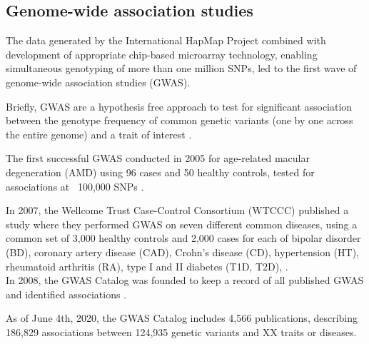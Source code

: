 
\subsection{Genome-wide association studies}

The data generated by the International HapMap Project combined with development of appropriate chip-based microarray technology, enabling simultaneous genotyping of more than one million SNPs, led to the first wave of genome-wide association studies (GWAS).

Briefly, GWAS are a hypothesis free approach to test for significant association between the genotype frequency of common genetic variants (one by one across the entire genome) and a trait of interest \cite{mccarthy2008genome}. 

The first successful GWAS conducted in 2005 for age-related macular degeneration (AMD) using 96 cases and 50 healthy controls, tested for associations at ~100,000 SNPs \cite{klein2005complement}. 



In 2007, the Wellcome Trust Case-Control Consortium (WTCCC) published a study where they performed GWAS on seven different common diseases, using a common set of 3,000 healthy controls and 2,000 cases for each of bipolar disorder (BD), coronary artery disease (CAD), Crohn's disease (CD), hypertension (HT), rheumatoid arthritis (RA), type I and II diabetes (T1D, T2D), \cite{wellcome2007genome}.\\ 

In 2008, the GWAS Catalog was founded to keep a record of all published GWAS and identified associations \cite{}.

\cite{welter2014nhgri}

As of June 4th, 2020, the GWAS Catalog includes 4,566 publications, describing 186,829 associations between 124,935 genetic variants and XX traits or diseases.




